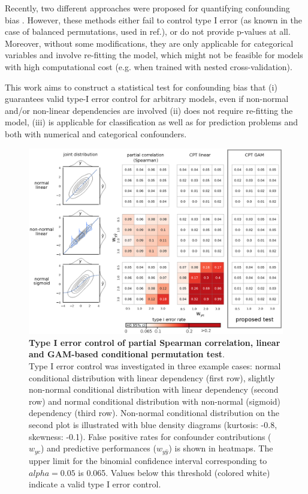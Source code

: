\documentclass{article}
\begin{document}
Recently, two different approaches were proposed for quantifying confounding bias \citep{chaibub2019permutation, ferrari2020measuring}. However, these methods either fail to control type I error (as known in the case of balanced permutations\cite{southworth2009properties, hemerik2018exact}, used in ref.\cite{chaibub2019permutation}), or do not provide p-values at all\cite{ferrari2020measuring}. 
Moreover, without some modifications, they are only applicable for categorical variables and involve re-fitting the model, which might not be feasible for models with high computational cost (e.g. when trained with nested cross-validation).

This work aims to construct a statistical test for confounding bias that (i) guarantees valid type-I error control for arbitrary models, even if non-normal and/or non-linear dependencies are involved (ii) does not require re-fitting the model, (iii) is applicable for classification as well as for prediction problems and both with numerical and categorical confounders.

\begin{figure}[!b]
  \centering
  \includegraphics[width=0.5\paperwidth]{fig/sim_h0_demo.eps}
  \caption{\textbf{Type I error control of partial Spearman correlation, linear and GAM-based conditional permutation test}. \\
  Type I error control was investigated in three example cases: normal conditional distribution with linear dependency (first row), slightly non-normal conditional distribution with linear dependency (second row) and normal conditional distribution with non-normal (sigmoid) dependency (third row). Non-normal conditional distribution on the second plot is illustrated with blue density diagrams (kurtosis: -0.8, skewness: -0.1). False positive rates for confounder contributions ($w_{yc}$) and predictive performances ($w_{y\hat{y}}$) is shown in heatmaps. The upper limit for the binomial confidence interval corresponding to $alpha=0.05$ is 0.065. Values below this threshold (colored white) indicate a valid type I error control.
  }
  \label{fig:sim-h0-demo}
\end{figure}
\end{document}
